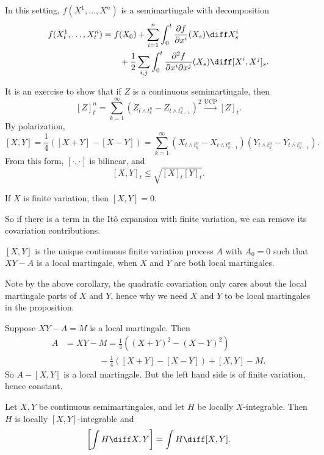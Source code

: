 \documentclass[12pt]{article}
\begin{document}
In this setting, $f(X^1, \ldots, X^{n})$ is a semimartingale with decomposition
\begin{align*}
	f(X_t^{1}, \ldots, X_t^{n}) &= f(X_0) + \sum_{i = 1}^{n} \int_0^{t} \frac{\partial f}{\partial x^{i}}(X_s) \diff X^i_s \\
				    & \qquad + \frac 12 \sum_{i, j} \int_0^{t} \frac{\partial^2 f}{\partial x^{i} \partial x^{j}} (X_s) \diff [X^{i}, X^{j}]_s.
\end{align*}

It is an exercise to show that if $Z$ is a continuous semimartingale, then
\[
	[Z]_t^{n} = \sum_{k = 1}^{\infty} (Z_{t \wedge t_k^{n}} - Z_{t \wedge t_{k-1}^{n}})^2 \overset{\text{UCP}}\to [Z]_t.
\]
By polarization,
\[
	[X, Y] = \frac 14 ([X + Y] - [X - Y]) = \sum_{k = 1}^{\infty} (X_{t \wedge t_{k}^{n}} - X_{t \wedge t_{k-1}^n})(Y_{t \wedge t_{k}^n} - Y_{t \wedge t_{k-1}^n}).
\]
From this form, $[\cdot, \cdot]$ is bilinear, and
\[
	[X, Y]_t \leq \sqrt{[X]_t [Y]_t}.
\]
\begin{corollary}
	If $X$ is finite variation, then $[X, Y] = 0$.
\end{corollary}

So if there is a term in the It\^o expansion with finite variation, we can remove its covariation contributions.

\begin{proposition}
	$[X, Y]$ is the unique continuous finite variation process $A$ with $A_0 = 0$ such that $XY - A$ is a local martingale, when $X$ and $Y$ are both local martingales.
\end{proposition}

Note by the above corollary, the quadratic covariation only cares about the local martingale parts of $X$ and $Y$, hence why we need $X$ and $Y$ to be local martingales in the proposition.

\begin{proofbox}
	Suppose $XY - A = M$ is a local martingale. Then
	\begin{align*}
		A &= XY - M = \frac 14((X + Y)^2 - (X - Y)^2) \\
		& \qquad \qquad - \frac 14 ([X + Y] - [X - Y]) + [X, Y] - M.
	\end{align*}
	So $A - [X, Y]$ is a local martingale. But the left hand side is of finite variation, hence constant.
\end{proofbox}

\begin{theorem}
	Let $X, Y$ be continuous semimartingales, and let $H$ be locally $X$-integrable. Then $H$ is locally $[X, Y]$-integrable and
	\[
		\left[ \int H \diff X, Y \right] = \int H \diff [X, Y].
	\]
\end{theorem}
\end{document}
